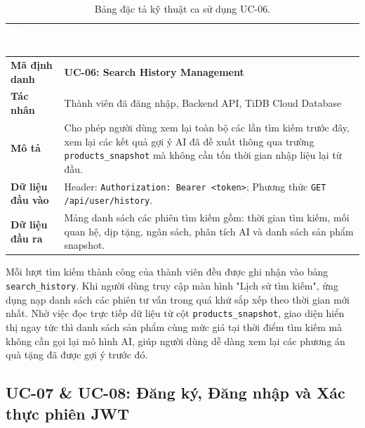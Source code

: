 \begin{table}[htbp]
\centering
\caption{Bảng đặc tả kỹ thuật ca sử dụng UC-06.}
\label{tab:spec_uc06}
\small
\renewcommand{\arraystretch}{1.2}
\begin{tabularx}{\textwidth}{|p{3.2cm}|X|}
\hline
\rowcolor{PrimaryBlue}
\textcolor{white}{\textbf{Thuộc tính}} & \textcolor{white}{\textbf{Nội dung đặc tả chi tiết}} \\
\hline
\textbf{Mã định danh} & \textbf{UC-06: Search History Management} \\
\hline
\textbf{Tác nhân} & Thành viên đã đăng nhập, Backend API, TiDB Cloud Database \\
\hline
\textbf{Mô tả} & Cho phép người dùng xem lại toàn bộ các lần tìm kiếm trước đây, xem lại các kết quả gợi ý AI đã đề xuất thông qua trường \texttt{products\_snapshot} mà không cần tốn thời gian nhập liệu lại từ đầu. \\
\hline
\textbf{Dữ liệu đầu vào} & Header: \texttt{Authorization: Bearer <token>}; Phương thức \texttt{GET /api/user/history}. \\
\hline
\textbf{Dữ liệu đầu ra} & Mảng danh sách các phiên tìm kiếm gồm: thời gian tìm kiếm, mối quan hệ, dịp tặng, ngân sách, phân tích AI và danh sách sản phẩm snapshot. \\
\hline
\end{tabularx}
\end{table}

Mỗi lượt tìm kiếm thành công của thành viên đều được ghi nhận vào bảng \texttt{search\_history}. Khi người dùng truy cập màn hình "Lịch sử tìm kiếm", ứng dụng nạp danh sách các phiên tư vấn trong quá khứ sắp xếp theo thời gian mới nhất. Nhờ việc đọc trực tiếp dữ liệu từ cột \texttt{products\_snapshot}, giao diện hiển thị ngay tức thì danh sách sản phẩm cùng mức giá tại thời điểm tìm kiếm mà không cần gọi lại mô hình AI, giúp người dùng dễ dàng xem lại các phương án quà tặng đã được gợi ý trước đó.

\subsection{UC-07 \& UC-08: Đăng ký, Đăng nhập và Xác thực phiên JWT}

